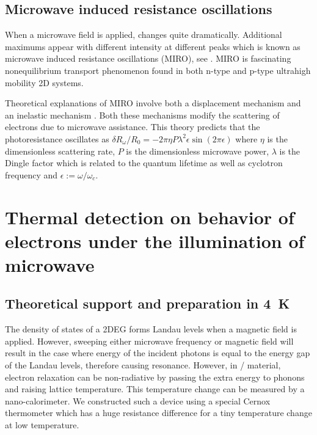 \documentclass[12pt]{ruthesis}
\begin{document}
\section{Microwave induced resistance oscillations}\label{MIRO}

When a microwave field is applied,  changes quite dramatically.
Additional maximums appear with different intensity at different peaks which is known as microwave induced resistance oscillations (MIRO), see .
MIRO is fascinating nonequilibrium transport phenomenon found in both n-type and p-type ultrahigh mobility 2D systems. 


 
Theoretical explanations of MIRO involve both a displacement mechanism and an inelastic mechanism \cite{PhysRevB.89.125401}.
Both these mechanisms modify the scattering of electrons due to microwave assistance. This theory predicts that the photoresistance oscillates as
$\delta R_{\omega}/R_{0} =-2\pi\eta P\lambda^{2}\epsilon \sin(2\pi\epsilon)$
where $\eta$ is the dimensionless scattering rate, $P$ is the dimensionless microwave power, $\lambda$ is the Dingle factor which is related to the quantum lifetime as well as cyclotron frequency and $\epsilon :=\omega/\omega_{c}$. 



\chapter{Thermal detection on behavior of electrons under the illumination of microwave}\label{Thermal}





\section{Theoretical support and preparation in \SI{4}{K}}\label{Theoretical}

The density of states of a 2DEG forms Landau levels when a magnetic field is applied.
However, sweeping either microwave frequency or magnetic field will result in the case where energy of the incident photons is equal to the energy gap of the Landau levels, therefore causing resonance.
However, in / material, electron relaxation can be non-radiative by passing the extra energy to phonons and raising lattice temperature.
This temperature change can be measured by a nano-calorimeter.
We constructed such a device using a special Cernox thermometer which has a huge resistance difference for a tiny temperature change at low temperature.
\end{document}
